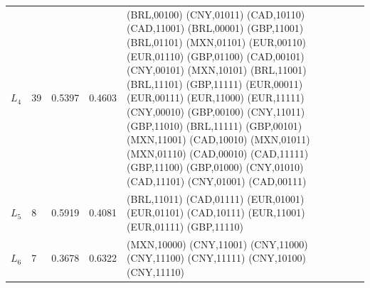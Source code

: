 \begin{tabular}{lllll}
$L_{4}$ & 39 & 0.5397 & 0.4603 &
  \begin{minipage}[t]{0.55\textwidth}\raggedright\scriptsize
  (BRL,00100) (CNY,01011) (CAD,10110) (CAD,11001) (BRL,00001)
  (GBP,11001) (BRL,01101) (MXN,01101) (EUR,00110) (EUR,01110)
  (GBP,01100) (CAD,00101) (CNY,00101) (MXN,10101) (BRL,11001)
  (BRL,11101) (GBP,11111) (EUR,00011) (EUR,00111) (EUR,11000)
  (EUR,11111) (CNY,00010) (GBP,00100) (CNY,11011) (GBP,11010)
  (BRL,11111) (GBP,00101) (MXN,11001) (CAD,10010) (MXN,01011)
  (MXN,01110) (CAD,00010) (CAD,11111) (GBP,11100) (GBP,01000)
  (CNY,01010) (CAD,11101) (CNY,01001) (CAD,00111)
  \end{minipage} \\[2pt]
$L_{5}$ & 8 & 0.5919 & 0.4081 &
  \begin{minipage}[t]{0.55\textwidth}\raggedright\scriptsize
  (BRL,11011) (CAD,01111) (EUR,01001) (EUR,01101) (CAD,10111)
  (EUR,11001) (EUR,01111) (GBP,11110)
  \end{minipage} \\[2pt]
$L_{6}$ & 7 & 0.3678 & 0.6322 &
  \begin{minipage}[t]{0.55\textwidth}\raggedright\scriptsize
  (MXN,10000) (CNY,11001) (CNY,11000) (CNY,11100) (CNY,11111)
  (CNY,10100) (CNY,11110)
  \end{minipage} \\
\bottomrule
\end{tabular}
